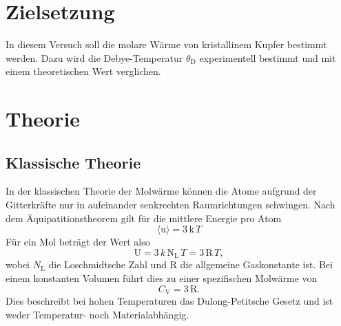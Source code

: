 \section{Zielsetzung}
\label{sec:Zielsetzung}
In diesem Versuch soll die molare Wärme von kristallinem Kupfer bestimmt werden.
Dazu wird die Debye-Temperatur $\theta_\text{D}$ experimentell bestimmt und mit einem theoretischen
Wert verglichen.

\section{Theorie}
\label{sec:Theorie}

\subsection{Klassische Theorie}
\label{sec:Klassische Theorie}
In der klassischen Theorie der Molwärme können die Atome aufgrund der Gitterkräfte nur
in aufeinander senkrechten Raumrichtungen schwingen. Nach dem Äquipatitionstheorem
gilt für die mittlere Energie pro Atom
\begin{equation}
  \langle \text{u} \rangle = 3\,\text{k}\,T
\end{equation}
Für ein Mol beträgt der Wert also
\begin{equation}
  \text{U} = 3\, k\, \text{N}_\text{L}\, T = 3\,\text{R}\,T,
\end{equation}
wobei $N_\text{L}$ die Loschmidtsche Zahl und $\text{R}$ die allgemeine Gaskonstante ist.
Bei einem konstanten Volumen führt dies zu einer spezifischen Molwärme von
\begin{equation}
  C_\text{V} = 3\,\text{R}.
\end{equation}
Dies beschreibt bei hohen Temperaturen das Dulong-Petitsche Gesetz und ist weder
Temperatur- noch Materialabhängig.

